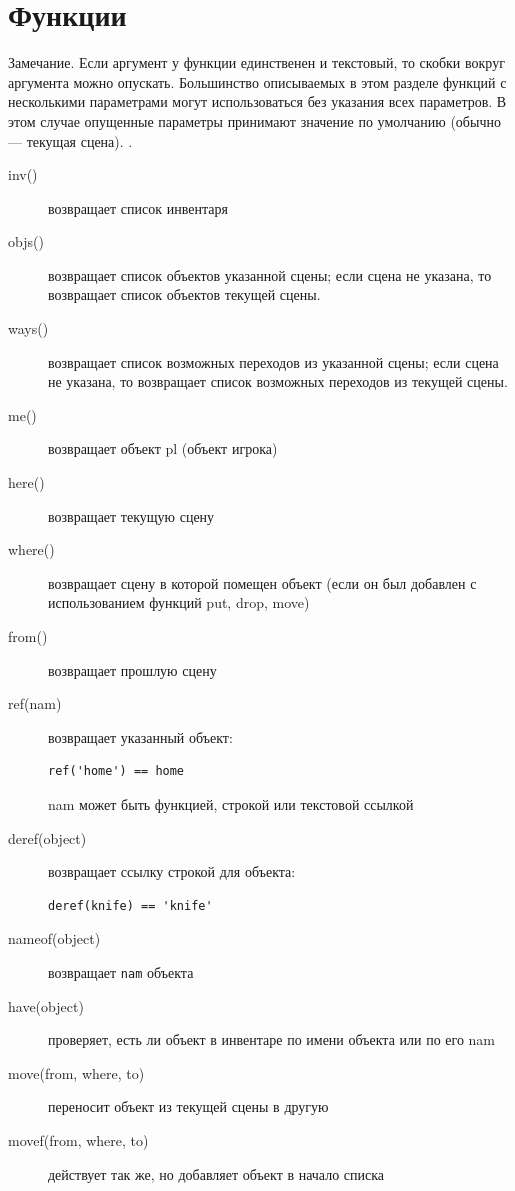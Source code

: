 \documentclass[a4paper,12pt]{article}
\begin{document}
\section{Функции}
Замечание. Если аргумент у функции единственен и текстовый, то скобки вокруг аргумента можно опускать. Большинство описываемых в этом разделе функций с несколькими параметрами могут 
использоваться без указания всех параметров. В этом случае опущенные параметры принимают значение по умолчанию (обычно --- текущая сцена).
.
\begin{description}
\item[inv()]  возвращает список инвентаря
\item[objs()]  возвращает список объектов указанной сцены; если сцена не указана, то возвращает список объектов текущей сцены.
\item[ways()]  возвращает список возможных переходов из  указанной сцены; если сцена не указана, то возвращает список возможных переходов из  текущей сцены.
\item[me()]  возвращает объект pl (объект игрока)
\item[here()]  возвращает текущую сцену
\item[where()]  возвращает сцену в которой помещен объект (если он был добавлен с использованием функций put, drop, move)
\item[from()]  возвращает прошлую сцену
\item[ref(nam)]  возвращает указанный объект: \begin{verbatim}ref('home') == home\end{verbatim} nam может быть функцией, строкой или текстовой ссылкой
\item[deref(object)]  возвращает ссылку строкой для объекта: \begin{verbatim}deref(knife) == 'knife'\end{verbatim}
\item[nameof(object)]  возвращает \verb/nam/ объекта
\item[have(object)]  проверяет, есть ли объект в инвентаре по имени объекта или по его nam
\item[move(from, where, to)]  переносит объект из текущей сцены в другую
\item[movef(from, where, to)]  действует так же, но добавляет объект в начало списка

\end{description}
\end{document}
